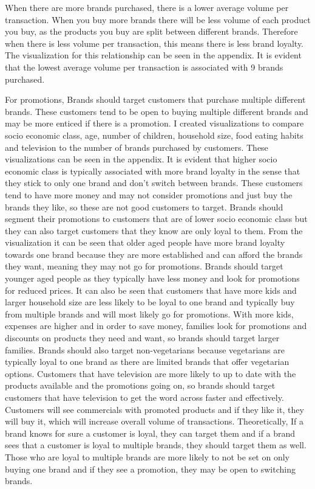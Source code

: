 \documentclass[11pt]{article}
\begin{document}
When there are more brands purchased, there is a lower average volume per transaction. When you buy more brands there will be less volume of each product you buy, as the products you buy are split between different brands. Therefore when there is less volume per transaction, this means there is less brand loyalty. The visualization for this relationship can be seen in the appendix. It is evident that the lowest average volume per transaction is associated with 9 brands purchased. 

For promotions, Brands should target customers that purchase multiple different brands. These customers tend to be open to buying multiple different brands and may be more enticed if there is a promotion. I created visualizations to compare socio economic class, age, number of children, household size, food eating habits and television to the number of brands purchased by customers. These visualizations can be seen in the appendix. It is evident that higher socio economic class is typically associated with more brand loyalty in the sense that they stick to only one brand and don’t switch between brands. These customers tend to have more money and may not consider promotions and just buy the brands they like, so these are not good customers to target. Brands should segment their promotions to customers that are of lower socio economic class but they can also target customers that they know are only loyal to them. From the visualization it can be seen that older aged people have more brand loyalty towards one brand because they are more established and can afford the brands they want, meaning they may not go for promotions. Brands should target younger aged people as they typically have less money and look for promotions for reduced prices. It can also be seen that customers that have more kids and larger household size are less likely to be loyal to one brand and typically buy from multiple brands and will most likely go for promotions. With more kids, expenses are higher and in order to save money, families look for promotions and discounts on products they need and want, so brands should target larger families. Brands should also target non-vegetarians because vegetarians are typically loyal to one brand as there are limited brands that offer vegetarian options. Customers that have television are more likely to up to date with the products available and the promotions going on, so brands should target customers that have television to get the word across faster and effectively. Customers will see commercials with promoted products and if they like it, they will buy it, which will increase overall volume of transactions. Theoretically, If a brand knows for sure a customer is loyal, they can target them and if a brand sees that a customer is loyal to multiple brands, they should target them as well. Those who are loyal to multiple brands are more likely to not be set on only buying one brand and if they see a promotion, they may be open to switching brands. 
\end{document}
